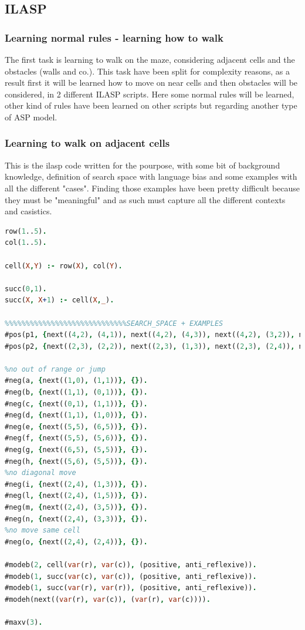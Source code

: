 \subsection{ILASP}

\subsubsection{Learning normal rules - learning how to walk}

The first task is learning to walk on the maze, considering adjacent cells and the obstacles (walls and co.). This task have been split for complexity reasons, as a result first it will be learned how to move on near cells and then obstacles will be considered, in 2 different ILASP scripts. Here some normal rules will be learned, other kind of rules have been learned on other scripts but regarding another type of ASP model. 

\subsubsection{Learning to walk on adjacent cells}

This is the ilasp code written for the pourpose, with some bit of background knowledge, definition of search space with language bias and some examples with all the different "cases".  Finding those examples have been pretty difficult because they must be "meaningful" and as such must capture all the different contexts and casistics.

\newpage
\begin{lstlisting}[language=Prolog]
%%%%%%%%%%%%%%%%%%%%%%%%learn how to move on near cells
row(1..5).
col(1..5).

cell(X,Y) :- row(X), col(Y).

succ(0,1).
succ(X, X+1) :- cell(X,_).

%%%%%%%%%%%%%%%%%%%%%%%%%%%%%SEARCH_SPACE + EXAMPLES
#pos(p1, {next((4,2), (4,1)), next((4,2), (4,3)), next((4,2), (3,2)), next((4,2), (5,2))}, {}).
#pos(p2, {next((2,3), (2,2)), next((2,3), (1,3)), next((2,3), (2,4)), next((2,3), (3,3))}, {}).

%no out of range or jump
#neg(a, {next((1,0), (1,1))}, {}).
#neg(b, {next((1,1), (0,1))}, {}).
#neg(c, {next((0,1), (1,1))}, {}).
#neg(d, {next((1,1), (1,0))}, {}).
#neg(e, {next((5,5), (6,5))}, {}).
#neg(f, {next((5,5), (5,6))}, {}).
#neg(g, {next((6,5), (5,5))}, {}).
#neg(h, {next((5,6), (5,5))}, {}).
%no diagonal move
#neg(i, {next((2,4), (1,3))}, {}).
#neg(l, {next((2,4), (1,5))}, {}).
#neg(m, {next((2,4), (3,5))}, {}).
#neg(n, {next((2,4), (3,3))}, {}).
%no move same cell
#neg(o, {next((2,4), (2,4))}, {}).

#modeb(2, cell(var(r), var(c)), (positive, anti_reflexive)).
#modeb(1, succ(var(c), var(c)), (positive, anti_reflexive)).
#modeb(1, succ(var(r), var(r)), (positive, anti_reflexive)).
#modeh(next((var(r), var(c)), (var(r), var(c)))).

#maxv(3).
\end{lstlisting}

